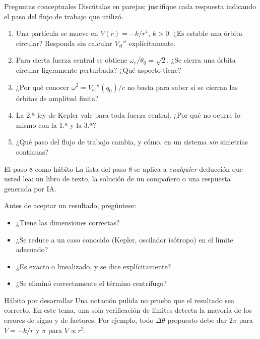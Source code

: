 \documentclass[11pt]{beamer}
\newcommand{\Vef}{V_{\mathrm{ef}}}
\begin{document}
\begin{frame}{Preguntas conceptuales}
\small
Discútalas en parejas; justifique cada respuesta indicando el paso del flujo de trabajo que utilizó.
\begin{enumerate}
  \item Una partícula se mueve en $V(r)=-k/r^4$, $k>0$. ¿Es estable una órbita circular? Responda sin calcular $\Vef''$ explícitamente.
  \item Para cierta fuerza central se obtiene $\omega_r/\dot\theta_0=\sqrt2$. ¿Se cierra una órbita circular ligeramente perturbada? ¿Qué aspecto tiene?
  \item ¿Por qué conocer $\omega^2=\Vef''(q_0)/c$ no basta para saber si se cierran las órbitas de amplitud finita?
  \item La 2.ª ley de Kepler vale para toda fuerza central. ¿Por qué no ocurre lo mismo con la 1.ª y la 3.ª?
  \item ¿Qué paso del flujo de trabajo cambia, y cómo, en un sistema \emph{sin} simetrías continuas?
\end{enumerate}
\end{frame}

\begin{frame}{El paso 8 como hábito}
\small
La lista del paso 8 se aplica a \emph{cualquier} deducción que usted lea: un libro de texto, la solución de un compañero o una respuesta generada por IA.

\vspace{0.3em}
Antes de aceptar un resultado, pregúntese:
\begin{itemize}
  \item ¿Tiene las dimensiones correctas?
  \item ¿Se reduce a un caso conocido (Kepler, oscilador isótropo) en el límite adecuado?
  \item ¿Es exacto o linealizado, y se dice explícitamente?
  \item ¿Se eliminó correctamente el término centrífugo?
\end{itemize}
\vspace{0.3em}
\begin{alertblock}{Hábito por desarrollar}
\footnotesize
Una notación pulida no prueba que el resultado sea correcto. En este tema, una sola verificación de límites detecta la mayoría de los errores de signo y de factores. Por ejemplo, todo $\Delta\theta$ propuesto debe dar $2\pi$ para $V=-k/r$ y $\pi$ para $V\propto r^2$.
\end{alertblock}
\end{frame}
\end{document}
